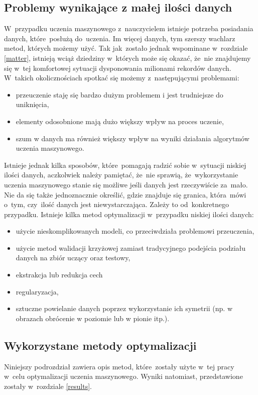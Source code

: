\subsection{Problemy wynikające z małej ilości danych}\label{problems}
W~przypadku uczenia maszynowego z~nauczycielem istnieje potrzeba posiadania danych, które~posłużą do~uczenia. Im więcej danych, tym szerszy wachlarz metod, których możemy użyć. Tak jak~zostało jednak wspominane w~rozdziale \ref{matter}, istnieją wciąż dziedziny w~których może się okazać, że~nie znajdujemy się w~tej komfortowej sytuacji dysponowania milionami rekordów danych. W~takich okolicznościach spotkać się możemy z~następującymi problemami:

\begin{itemize}
\item przeuczenie staję się bardzo dużym problemem i jest trudniejsze do uniknięcia,
\item elementy odosobnione mają dużo większy wpływ na proces uczenie,
\item szum w danych ma również większy wpływ na wyniki działania algorytmów uczenia maszynowego.
\end{itemize}
Istnieje jednak kilka sposobów, które~pomagają radzić sobie w~sytuacji niskiej ilości danych, aczkolwiek należy pamiętać, że~nie sprawią, że~wykorzystanie uczenia maszynowego stanie się możliwe jeśli danych jest rzeczywiście za~mało. Nie da się także jednoznacznie określić, gdzie znajduje się granica, która~mówi o~tym, czy~ilość danych jest niewystarczająca. Zależy to od~konkretnego przypadku. Istnieje kilka metod optymalizacji w~przypadku niskiej ilości danych:
\begin{itemize}
\item użycie nieskomplikowanych modeli, co przeciwdziała problemowi przeuczenia,
\item użycie metod walidacji krzyżowej zamiast tradycyjnego podejścia podziału danych na zbiór uczący oraz testowy,
\item ekstrakcja lub redukcja cech
\item regularyzacja,
\item sztuczne powielanie danych poprzez wykorzystanie ich symetrii (np. w obrazach obrócenie w poziomie lub w pionie itp.).
\end{itemize}


\subsection{Wykorzystane metody optymalizacji}
Niniejszy podrozdział zawiera opis metod, które~zostały użyte w~tej pracy w~celu optymalizacji uczenia maszynowego. Wyniki 
natomiast, przedstawione zostały w~rozdziale \ref{results}.
